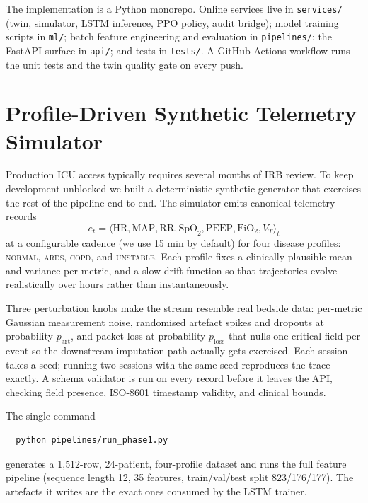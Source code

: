 \documentclass[conference]{IEEEtran}
\begin{document}
The implementation is a Python monorepo. Online services live in \texttt{services/} (twin, simulator, LSTM inference, PPO policy, audit bridge); model training scripts in \texttt{ml/}; batch feature engineering and evaluation in \texttt{pipelines/}; the FastAPI surface in \texttt{api/}; and tests in \texttt{tests/}. A GitHub Actions workflow runs the unit tests and the twin quality gate on every push.

\section{Profile-Driven Synthetic Telemetry Simulator}
\label{sec:simulator}

Production ICU access typically requires several months of IRB review. To keep development unblocked we built a deterministic synthetic generator that exercises the rest of the pipeline end-to-end. The simulator emits canonical telemetry records
\[
  e_t = \langle \text{HR}, \text{MAP}, \text{RR}, \text{SpO}_2, \text{PEEP}, \text{FiO}_2, V_T \rangle_t
\]
at a configurable cadence (we use 15 min by default) for four disease profiles: \textsc{normal}, \textsc{ards}, \textsc{copd}, and \textsc{unstable}. Each profile fixes a clinically plausible mean and variance per metric, and a slow drift function so that trajectories evolve realistically over hours rather than instantaneously.

Three perturbation knobs make the stream resemble real bedside data: per-metric Gaussian measurement noise, randomised artefact spikes and dropouts at probability $p_{\text{art}}$, and packet loss at probability $p_{\text{loss}}$ that nulls one critical field per event so the downstream imputation path actually gets exercised. Each session takes a seed; running two sessions with the same seed reproduces the trace exactly. A schema validator is run on every record before it leaves the API, checking field presence, ISO-8601 timestamp validity, and clinical bounds.

The single command
\begin{verbatim}
  python pipelines/run_phase1.py
\end{verbatim}
generates a 1{,}512-row, 24-patient, four-profile dataset and runs the full feature pipeline (sequence length 12, 35 features, train/val/test split 823/176/177). The artefacts it writes are the exact ones consumed by the LSTM trainer.
\end{document}
